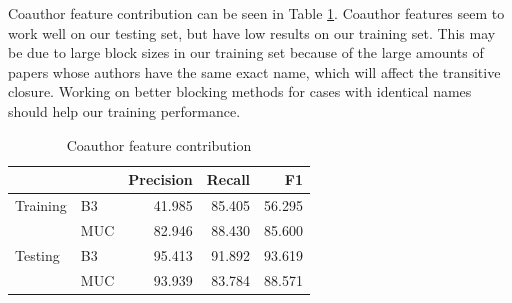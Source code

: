 \documentclass[twocolumn,letterpaper]{article}
\begin{document}
Coauthor feature contribution can be seen in Table \ref{tab:coauthor}. Coauthor features seem to work well on our testing set, but have low results on our training set. This may be due to large block sizes in our training set because of the large amounts of papers whose authors have the same exact name, which will affect the transitive closure. Working on better blocking methods for cases with identical names should help our training performance.


\begin{table}[ht]
\centering
\begin{tabular}{l || l | r r r}
 & & Precision & Recall & F1 \\ \hline
Training & B3 & 41.985 & 85.405 & 56.295 \\
 & MUC & 82.946 & 88.430 & 85.600\\ \hline
Testing & B3 & 95.413 & 91.892 & 93.619 \\
 & MUC & 93.939 & 83.784 & 88.571 \\
\end{tabular}
\caption{Coauthor feature contribution}
\label{tab:coauthor}
\end{table}
\end{document}
